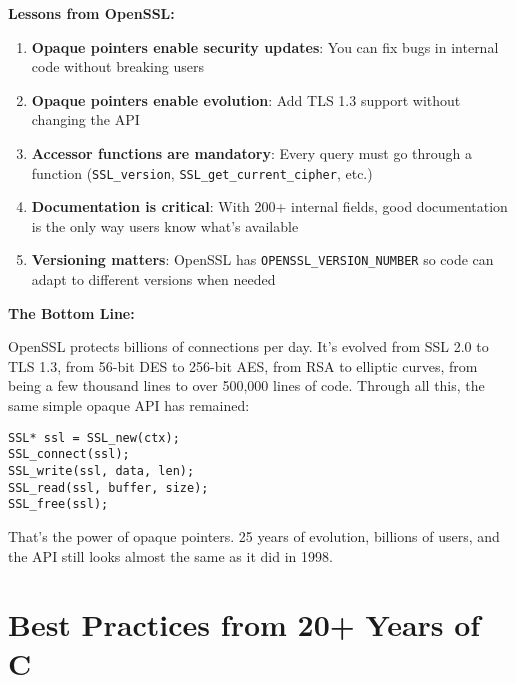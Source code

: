 \textbf{Lessons from OpenSSL:}

\begin{enumerate}
    \item \textbf{Opaque pointers enable security updates}: You can fix bugs in internal code without breaking users

    \item \textbf{Opaque pointers enable evolution}: Add TLS 1.3 support without changing the API

    \item \textbf{Accessor functions are mandatory}: Every query must go through a function (\texttt{SSL\_version}, \texttt{SSL\_get\_current\_cipher}, etc.)

    \item \textbf{Documentation is critical}: With 200+ internal fields, good documentation is the only way users know what's available

    \item \textbf{Versioning matters}: OpenSSL has \texttt{OPENSSL\_VERSION\_NUMBER} so code can adapt to different versions when needed
\end{enumerate}

\textbf{The Bottom Line:}

OpenSSL protects billions of connections per day. It's evolved from SSL 2.0 to TLS 1.3, from 56-bit DES to 256-bit AES, from RSA to elliptic curves, from being a few thousand lines to over 500,000 lines of code. Through all this, the same simple opaque API has remained:

\begin{lstlisting}
SSL* ssl = SSL_new(ctx);
SSL_connect(ssl);
SSL_write(ssl, data, len);
SSL_read(ssl, buffer, size);
SSL_free(ssl);
\end{lstlisting}

That's the power of opaque pointers. 25 years of evolution, billions of users, and the API still looks almost the same as it did in 1998.

\section{Best Practices from 20+ Years of C}

